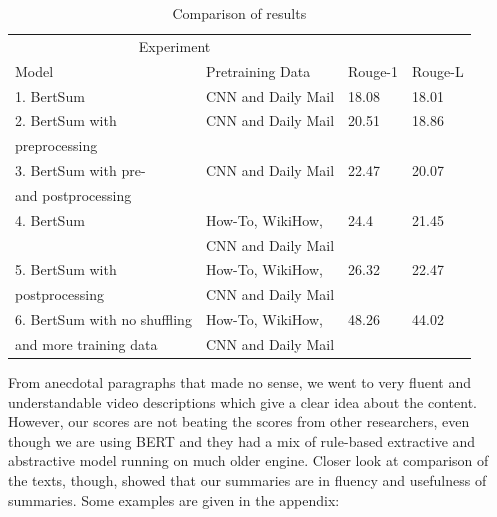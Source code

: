 \documentclass{article}
\begin{document}
\begin{table}[H]
  \caption{Comparison of results}
  \label{table1}
  \centering
  \begin{tabular}{llll}
    \toprule
    \multicolumn{2}{c}{Experiment}                   \\
    \cmidrule(r){1-2}
    Model     & Pretraining Data     & Rouge-1 &Rouge-L\\
    \midrule
   1. BertSum  & CNN  and Daily Mail &18.08 &18.01    \\
 \midrule   
    2. BertSum with  & CNN  and Daily Mail & 20.51 &18.86     \\
      preprocessing    & & \\
\midrule
    3. BertSum with pre-     & CNN  and Daily Mail  & 22.47&20.07  \\
      and postprocessing    & & \\
\midrule
  4. BertSum  & How-To, WikiHow,   & 24.4 &21.45     \\
& CNN  and Daily Mail&\\
\midrule
  5. BertSum with  & How-To, WikiHow, & 26.32 &22.47    \\
postprocessing &CNN  and Daily Mail &\\
\midrule
 6. BertSum with  no shuffling& How-To, WikiHow, & 48.26 &44.02    \\
and more training data &CNN  and Daily Mail &\\
     \bottomrule
  \end{tabular}
\end{table}


From anecdotal paragraphs that made no sense, we went to very fluent and understandable video descriptions which give a clear idea about the content. However, our scores are not beating the scores from other researchers, even though we are using BERT and they had a mix of rule-based extractive and abstractive model running on much older engine. Closer look at comparison of the texts, though, showed that our summaries are in fluency and usefulness of summaries. Some examples are given in the appendix:
\end{document}
